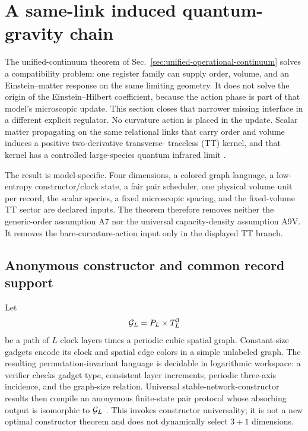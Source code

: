 \section{A same-link induced quantum-gravity chain}
\label{sec:same-link-induced-gravity}

The unified-continuum theorem of
Sec.~\ref{sec:unified-operational-continuum} solves a compatibility problem:
one register family can supply order, volume, and an Einstein--matter
response on the same limiting geometry.  It does not solve the origin of the
Einstein--Hilbert coefficient, because the action phase is part of that
model's microscopic update.  This section closes that narrower missing
interface in a different explicit regulator.  No curvature action is placed
in the update.  Scalar matter propagating on the same relational links that
carry order and volume induces a positive two-derivative transverse-
traceless (TT) kernel, and that kernel has a controlled large-species quantum
infrared limit \cite{XuSameLinkInduced2026}.

The result is model-specific.  Four dimensions, a colored graph language, a
low-entropy constructor/clock state, a fair pair scheduler, one physical
volume unit per record, the scalar species, a fixed microscopic spacing, and
the fixed-volume TT sector are declared inputs.  The theorem therefore
removes neither the generic-order assumption A7 nor the universal
capacity-density assumption A9V.  It removes the bare-curvature-action input
only in the displayed TT branch.

\subsection{Anonymous constructor and common record support}

Let
\begin{equation}
 {\cal G}_L=P_L\times T_L^3
 \label{eq:same-link-language}
\end{equation}
be a path of \(L\) clock layers times a periodic cubic spatial graph.
Constant-size gadgets encode its clock and spatial edge colors in a simple
unlabeled graph.  The resulting permutation-invariant language is decidable
in logarithmic workspace: a verifier checks gadget type, consistent layer
increments, periodic three-axis incidence, and the graph-size relation.
Universal stable-network-constructor results then compile an anonymous
finite-state pair protocol whose absorbing output is isomorphic to
\({\cal G}_L\) \cite{MichailSpirakis2016}.  This invokes constructor
universality; it is not a new optimal constructor theorem and does not
dynamically select \(3+1\) dimensions.

